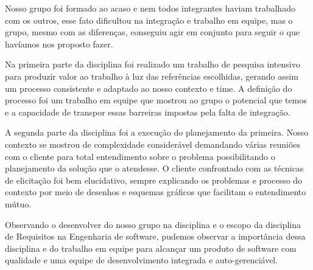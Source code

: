     Nosso grupo foi formado ao acaso e nem todos integrantes haviam trabalhado com os outros, esse fato 
  dificultou na integração e trabalho em equipe, mas o grupo, mesmo com as diferenças, conseguiu agir em conjunto 
  para seguir o que havíamos nos proposto fazer.
    
    Na primeira parte da disciplina foi realizado um trabalho de pesquisa intensivo para produzir valor ao 
  trabalho à luz das referências escolhidas, gerando assim um processo consistente e adaptado ao nosso contexto e time. 
  A definição do processo foi um trabalho em equipe que mostrou ao grupo o potencial que temos e a capacidade de 
  transpor essas barreiras impostas pela falta de integração.
    
    A segunda parte da disciplina foi a execução do planejamento da primeira. Nosso contexto se mostrou de 
  complexidade considerável demandando várias reuniões com o cliente para total entendimento sobre o problema 
  possibilitando o planejamento da solução que o atendesse. O cliente confrontado com as técnicas de elicitação 
  foi bem elucidativo, sempre explicando os problemas e processo do contexto por meio de desenhos e esquemas 
  gráficos que facilitam o entendimento mútuo.
    
    Observando o desenvolver do nosso grupo na disciplina e o escopo da disciplina de Requisitos na Engenharia de software, 
  pudemos observar a importância dessa disciplina e do trabalho em equipe para alcançar um produto de software com qualidade 
  e uma equipe de desenvolvimento integrada e auto-gerenciável.
